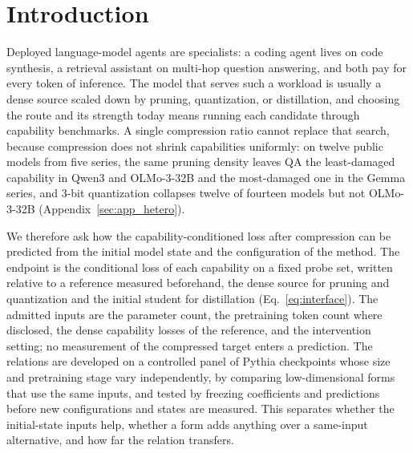 \section{Introduction}
\label{sec:intro}

Deployed language-model agents are specialists: a coding agent lives
on code synthesis, a retrieval assistant on multi-hop question
answering, and both pay for every token of inference. The model that
serves such a workload is usually a dense source scaled down by
pruning, quantization, or distillation, and choosing the route and its
strength today means running each candidate through capability
benchmarks. A single compression ratio cannot replace that search,
because compression does not shrink capabilities uniformly: on twelve
public models from five series, the same pruning density leaves QA the
least-damaged capability in Qwen3 and OLMo-3-32B and the most-damaged
one in the Gemma series, and 3-bit quantization collapses twelve of
fourteen models but not OLMo-3-32B (Appendix~\ref{sec:app_hetero}).

We therefore ask how the capability-conditioned loss after compression
can be predicted from the initial model state and the configuration of
the method. The endpoint is the conditional loss of each capability on
a fixed probe set, written relative to a reference measured
beforehand, the dense source for pruning and quantization and the
initial student for distillation (Eq.~\eqref{eq:interface}). The
admitted inputs are the parameter count, the pretraining token count
where disclosed, the dense capability losses of the reference, and the
intervention setting; no measurement of the compressed target enters a
prediction. The relations are developed on a controlled panel of
Pythia checkpoints whose size and pretraining stage vary
independently, by comparing low-dimensional forms that use the same
inputs, and tested by freezing coefficients and predictions before new
configurations and states are measured. This separates whether the
initial-state inputs help, whether a form adds anything over a
same-input alternative, and how far the relation transfers.

